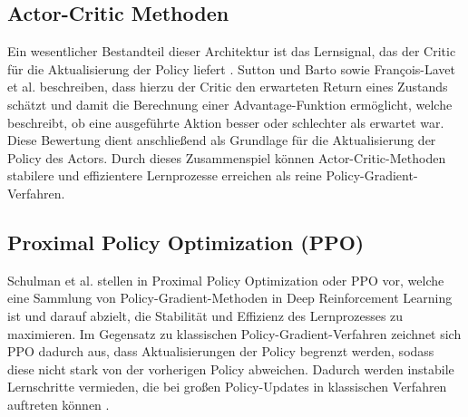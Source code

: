 \subsection{Actor-Critic Methoden}
Ein wesentlicher Bestandteil dieser Architektur ist das Lernsignal, das der Critic für die Aktualisierung der Policy liefert \cite{sutton2018reinforcement}. Sutton und Barto \cite{sutton2018reinforcement} sowie François-Lavet et al.  \cite{francois-lavetIntroductionDeepReinforcement2018} beschreiben, dass hierzu der Critic den erwarteten Return eines Zustands schätzt und damit die Berechnung einer Advantage-Funktion ermöglicht, welche beschreibt, ob eine ausgeführte Aktion besser oder schlechter als erwartet war. Diese Bewertung dient anschließend als Grundlage für die Aktualisierung der Policy des Actors. Durch dieses Zusammenspiel können Actor-Critic-Methoden stabilere und effizientere Lernprozesse erreichen als reine Policy-Gradient-Verfahren.


\subsection{Proximal Policy Optimization (PPO)} \label{PPO} %
Schulman et al. stellen in \cite{schulmanProximalPolicyOptimization2017} Proximal Policy Optimization oder PPO vor, welche eine Sammlung von Policy-Gradient-Methoden in Deep Reinforcement Learning ist und darauf abzielt, die Stabilität und Effizienz des Lernprozesses zu maximieren. \newline
Im Gegensatz zu klassischen Policy-Gradient-Verfahren zeichnet sich PPO dadurch aus, dass Aktualisierungen der Policy begrenzt werden, sodass diese nicht stark von der vorherigen Policy abweichen. Dadurch werden instabile Lernschritte vermieden, die bei großen Policy-Updates in klassischen Verfahren auftreten können \cite{schulmanProximalPolicyOptimization2017}.
